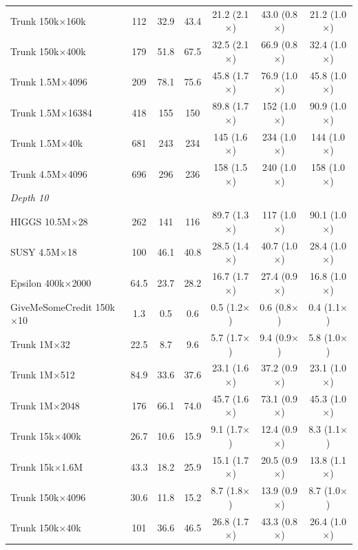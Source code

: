 \begin{table}[p]
\begin{tabular}{l|ccc|ccc}
        Trunk 150k$\times$160k & 112 & 32.9 & 43.4 & 21.2 (2.1$\times$) & 43.0 (0.8$\times$) & 21.2 (1.0$\times$) \\
        Trunk 150k$\times$400k & 179 & 51.8 & 67.5 & 32.5 (2.1$\times$) & 66.9 (0.8$\times$) & 32.4 (1.0$\times$) \\
        Trunk 1.5M$\times$4096 & 209 & 78.1 & 75.6 & 45.8 (1.7$\times$) & 76.9 (1.0$\times$) & 45.8 (1.0$\times$) \\
        Trunk 1.5M$\times$16384 & 418 & 155 & 150 & 89.8 (1.7$\times$) & 152 (1.0$\times$) & 90.9 (1.0$\times$) \\
        Trunk 1.5M$\times$40k & 681 & 243 & 234 & 145 (1.6$\times$) & 234 (1.0$\times$) & 144 (1.0$\times$) \\
        Trunk 4.5M$\times$4096 & 696 & 296 & 236 & 158 (1.5$\times$) & 240 (1.0$\times$) & 158 (1.0$\times$) \\
        \hline
        \multicolumn{7}{l}{\textit{Depth 10}} \\
        HIGGS 10.5M$\times$28 & 262 & 141 & 116 & 89.7 (1.3$\times$) & 117 (1.0$\times$) & 90.1 (1.0$\times$) \\
        SUSY 4.5M$\times$18 & 100 & 46.1 & 40.8 & 28.5 (1.4$\times$) & 40.7 (1.0$\times$) & 28.4 (1.0$\times$) \\
        Epsilon 400k$\times$2000 & 64.5 & 23.7 & 28.2 & 16.7 (1.7$\times$) & 27.4 (0.9$\times$) & 16.8 (1.0$\times$) \\
        GiveMeSomeCredit 150k$\times$10 & 1.3 & 0.5 & 0.6 & 0.5 (1.2$\times$) & 0.6 (0.8$\times$) & 0.4 (1.1$\times$) \\
        Trunk 1M$\times$32 & 22.5 & 8.7 & 9.6 & 5.7 (1.7$\times$) & 9.4 (0.9$\times$) & 5.8 (1.0$\times$) \\
        Trunk 1M$\times$512 & 84.9 & 33.6 & 37.6 & 23.1 (1.6$\times$) & 37.2 (0.9$\times$) & 23.1 (1.0$\times$) \\
        Trunk 1M$\times$2048 & 176 & 66.1 & 74.0 & 45.7 (1.6$\times$) & 73.1 (0.9$\times$) & 45.3 (1.0$\times$) \\
        Trunk 15k$\times$400k & 26.7 & 10.6 & 15.9 & 9.1 (1.7$\times$) & 12.4 (0.9$\times$) & 8.3 (1.1$\times$) \\
        Trunk 15k$\times$1.6M & 43.3 & 18.2 & 25.9 & 15.1 (1.7$\times$) & 20.5 (0.9$\times$) & 13.8 (1.1$\times$) \\
        Trunk 150k$\times$4096 & 30.6 & 11.8 & 15.2 & 8.7 (1.8$\times$) & 13.9 (0.9$\times$) & 8.7 (1.0$\times$) \\
        Trunk 150k$\times$40k & 101 & 36.6 & 46.5 & 26.8 (1.7$\times$) & 43.3 (0.8$\times$) & 26.4 (1.0$\times$) \\

\end{tabular}
\end{table}
